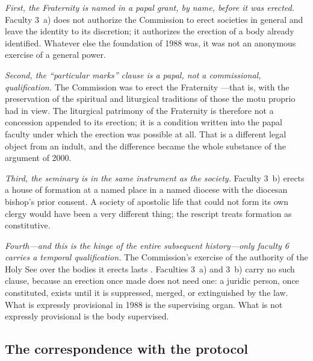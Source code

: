 \emph{First, the Fraternity is named in a papal grant, by name, before it
was erected.} Faculty 3~a) does not authorize the Commission to erect
societies in general and leave the identity to its discretion; it
authorizes the erection of a body already identified. Whatever else the
foundation of 1988 was, it was not an anonymous exercise of a general
power.

\emph{Second, the ``particular marks'' clause is a papal, not a
commissional, qualification.} The Commission was to erect the Fraternity
---that is, with the preservation of
the spiritual and liturgical traditions of those the motu proprio had in
view. The liturgical patrimony of the Fraternity is therefore not a
concession appended to its erection; it is a condition written into the
papal faculty under which the erection was possible at all. That is a
different legal object from an indult, and the difference became the
whole substance of the argument of 2000.

\emph{Third, the seminary is in the same instrument as the society.}
Faculty 3~b) erects a house of formation at a named place in a named
diocese with the diocesan bishop's prior consent. A society of apostolic
life that could not form its own clergy would have been a very different
thing; the rescript treats formation as constitutive.

\emph{Fourth---and this is the hinge of the entire subsequent
history---only faculty 6 carries a temporal qualification.} The
Commission's exercise of the authority of the Holy See over the bodies it
erects lasts . Faculties 3~a) and 3~b)
carry no such clause, because an erection once made does not need one: a
juridic person, once constituted, exists until it is suppressed, merged,
or extinguished by the law. What is expressly provisional in 1988 is the
supervising organ. What is not expressly provisional is the body
supervised.

\subsection{The correspondence with the protocol}

